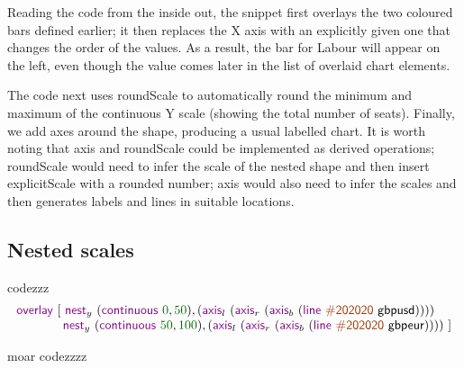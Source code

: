 \documentclass{jfp}
\newcommand{\num}[1]{\textcolor{numclr}{#1}}
\newcommand{\strf}[1]{\textnormal{\textcolor{strclr}{\sffamily #1}}}
\newcommand{\ident}[1]{\textnormal{\textcolor{idclr}{\sffamily #1}}}
\newcommand{\kvd}[1]{\textnormal{\textcolor{kvdclr}{\sffamily #1}}}
\begin{document}
\noindent
Reading the code from the inside out, the snippet first overlays the two coloured bars defined
earlier; it then replaces the X axis with an explicitly given one that changes the order of the
values. As a result, the bar for \strf{Labour} will appear on the left, even though the value
comes later in the list of overlaid chart elements.

The code next uses \kvd{roundScale} to automatically round the minimum and maximum of the
continuous Y scale (showing the total number of seats). Finally, we add axes around the shape,
producing a usual labelled chart.  It is worth noting that \kvd{axis} and \kvd{roundScale}
could be implemented as derived operations; \kvd{roundScale} would need to infer the scale of
the nested shape and then insert \kvd{explicitScale} with a rounded number; \kvd{axis}
would also need to infer the scales and then generates labels and lines in suitable locations.

\subsection{Nested scales}

\newpage

codezzz
%
\begin{equation*}
\begin{array}{l}
\kvd{overlay}~[~
\kvd{nest}_y~(\kvd{continuous}~\num{0},\num{50}), (\kvd{axis}_l~(\kvd{axis}_r~(\kvd{axis}_b~(\kvd{line}~\strf{\#202020}~\ident{gbpusd}))))\\
\hspace{3.68em} \kvd{nest}_y~(\kvd{continuous}~\num{50},\num{100}), (\kvd{axis}_l~(\kvd{axis}_r~(\kvd{axis}_b~(\kvd{line}~\strf{\#202020}~\ident{gbpeur}))))~]\\
\end{array}
\end{equation*}

moar codezzzz
\end{document}
